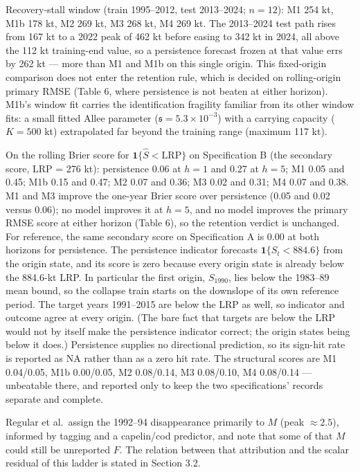 \documentclass[11pt]{article}
\begin{document}
Recovery-stall window (train 1995--2012, test 2013--2024; \(n=12\)): M1
254 kt, M1b 178 kt, M2 269 kt, M3 268 kt, M4 269 kt. The 2013--2024 test
path rises from 167 kt to a 2022 peak of 462 kt before easing to 342 kt
in 2024, all above the 112 kt training-end value,
so a persistence forecast frozen at that value errs by 262 kt --- more
than M1 and M1b on this single origin. This fixed-origin comparison does
not enter the retention rule, which is decided on rolling-origin primary
RMSE (Table 6, where persistence is not beaten at either horizon). M1b's
window fit carries the identification fragility familiar from its other
window fits: a small fitted Allee parameter
(\(\mathfrak s = 5.3\times10^{-3}\)) with a carrying capacity (\(K=500\)
kt) extrapolated far beyond the training range (maximum 117 kt).

On the rolling Brier score for \(\mathbf{1}\{\hat S<\mathrm{LRP}\}\) on
Specification B (the secondary score, LRP = 276 kt):
persistence 0.06 at \(h{=}1\) and 0.27 at \(h{=}5\); M1 0.05 and 0.45;
M1b 0.15 and 0.47; M2 0.07 and 0.36; M3 0.02 and 0.31; M4 0.07 and 0.38.
M1 and M3 improve the one-year Brier score over persistence (0.05 and
0.02 versus 0.06); no model improves it at \(h{=}5\), and no model
improves the primary RMSE score at either horizon (Table 6), so the
retention verdict is unchanged. For reference, the same secondary score on Specification A is 0.00 at
both horizons for persistence. The persistence indicator forecasts
\(\mathbf{1}\{S_t<884.6\}\) from the origin state, and its score is zero
because every origin state is already below the 884.6-kt LRP. In
particular the first origin, \(S_{1990}\), lies below the 1983--89 mean
bound, so the collapse train starts on the downslope of its own
reference period. The target years 1991--2015 are below the LRP as well,
so indicator and outcome agree at every origin. (The bare fact that targets are below the LRP
would not by itself make the persistence indicator correct; the origin
states being below it does.) Persistence supplies no directional prediction, so its sign-hit rate
is reported as NA rather than as a zero hit rate. The structural
scores are M1 0.04/0.05, M1b
0.00/0.05, M2 0.08/0.14, M3 0.08/0.10, M4 0.08/0.14 --- unbeatable
there, and reported only to keep the two specifications' records
separate and complete.

Regular et al.~assign the 1992--94 disappearance primarily to \(M\)
(peak \(\approx 2.5\)), informed by tagging and a capelin/cod predictor,
and note that some of that \(M\) could still be unreported \(F\). The
relation between that attribution and the scalar residual of this ladder
is stated in Section 3.2.
\end{document}
